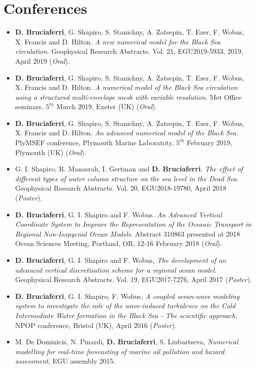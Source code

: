 \documentclass[a4paper, oneside, final]{scrartcl}
\begin{document}
\section{Conferences}
\noindent
\normalsize
\begin{itemize}

\item \textbf{D. Bruciaferri}, G. Shapiro, S. Stanichny, A. Zatsepin, T. Ezer, F. Wobus, X. Francis and D. Hilton. \textit{A new numerical model for the Black Sea circulation}. Geophysical Research Abstracts. Vol. 21, EGU2019-5933, 2019, April 2019 (\textit{Oral}).
\item \textbf{D. Bruciaferri}, G. Shapiro, S. Stanichny, A. Zatsepin, T. Ezer, F. Wobus, X. Francis and D. Hilton. \textit{A numerical model of the Black Sea circulation using a structured multi-envelope mesh with variable resolution}. Met Office seminars, $5^{th}$ March 2019, Exeter (UK) (\textit{Oral}).
\item \textbf{D. Bruciaferri}, G. Shapiro, S. Stanichny, A. Zatsepin, T. Ezer, F. Wobus, X. Francis and D. Hilton. \textit{An advanced numerical model of the Black Sea}. PlyMSEF conference, Plymouth Marine Laboratoty, $5^{th}$ February 2019, Plymouth (UK) (\textit{Oral}).
\item G. I. Shapiro, R. Manasrah, I. Gertman and \textbf{D. Bruciaferri}. \textit{The effect of different types of water column structure on the sea level in the Dead Sea}. Geophysical Research Abstracts. Vol. 20, EGU2018-19780, April 2018 (\textit{Poster}).
\item \textbf{D. Bruciaferri}, G. I. Shapiro and F. Wobus. \textit{An Advanced Vertical Coordinate System to Improve the Representation of the Oceanic Transport in Regional Non-Isopycnal Ocean Models}. Abstract 310863 presented at 2018 Ocean Sciences Meeting, Portland, OR, 12-16 February 2018 (\textit{Oral}).
\item \textbf{D. Bruciaferri}, G. I. Shapiro and F. Wobus, \textit{The development of an advanced vertical discretisation scheme for a regional ocean model}. Geophysical Research Abstracts. Vol. 19, EGU2017-7276, April 2017 (\textit{Poster}).
\item \textbf{D. Bruciaferri}, G. I. Shapiro, F. Wobus, \textit{A coupled ocean-wave modeling system to investigate the role of the wave-induced turbulence on the Cold Intermediate Water formation in the Black Sea - The scientific approach}, NPOP conference, Bristol (UK), April 2016 (\textit{Poster}).
\item M. De Dominicis, N. Pinardi, \textbf{D. Bruciaferri}, S. Liubartseva, \textit{Numerical modelling for real-time forecasting of marine oil pollution and hazard assessment}, EGU assembly 2015.
\end{itemize}
\end{document}
